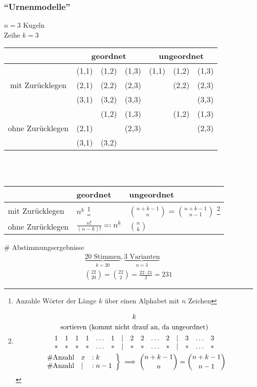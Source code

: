 \subsubsection{\enquote{Urnenmodelle}}
\begin{bsp*}
	$n=3$ Kugeln\\
	Zeihe $k=3$ \\
	\begin{tabular}{ c | c c c | c c c }
								&\multicolumn{3}{c|}{geordnet}	&\multicolumn{3}{c}{ungeordnet}		\\	\hline
		\multirow{3}{*}{mit Zurücklegen}	& (1,1)	& (1,2)	& (1,3)	& (1,1)	& (1,2)	& (1,3)		\\
								& (2,1)	& (2,2)	& (2,3)	&		& (2,2)	& (2,3)		\\
								& (3,1)	& (3,2)	& (3,3)	&		&		& (3,3)		\\	\hline
		\multirow{3}{*}{ohne Zurücklegen}	&		& (1,2)	& (1,3)	&		& (1,2)	& (1,3)		\\
								& (2,1)	&		& (2,3)	&		&		& (2,3)		\\
								& (3,1)	& (3,2)	&		&		&		&				
	\end{tabular}\\ \phantom{.} \\
	\begin{tabular}{ l | l | l }
						& geordnet															& ungeordnet							\\	\hline
		mit Zurücklegen		& $n^k$ \footnote{Anzahle Wörter der Länge $k$ über einen Alphabet mit $n$ Zeichen}	& $\binom{n+k-1}{n} = \binom{n+k-1}{n-1}$ \footnote{\begin{gather*}
		\underbrace{1 2 3 1 1 2 1 3 2 3 \dots 3 2}_k \\
		\text{sortieren (kommt nicht drauf an, da ungeordnet)}\\
		\begin{array}{ c c c c c c c c c c c c c c c }
			1	&1	&1	&1	&\dots	&1	&|	&2	&2	&\dots	&2	&|	&3	&\dots	&3	\\
			*	&*	&*	&*	&\dots	&*	&|	&*	&*	&\dots	&*	&|	&*	&\dots	&*	
		\end{array}\\
		\left.\begin{array}{ l l l }
			\# \text{Anzahl}	& x	&: k	\\
			\# \text{Anzahl}	& |	&: n-1
		\end{array} \right\} \implies \binom{n+k-1}{n} = \binom{n+k-1}{n-1}
		\end{gather*}}	\\	\hline
		ohne Zurücklegen	& $\frac{n!}{(n-k)!} \eqqcolon n^{\underline{k}}$								& $\binom{n}{k}$						
	\end{tabular}
\end{bsp*}
\begin{bsp*}{\# Abstimmungsergebnisse}
	\begin{gather*}
		\underbrace{20 \text{ Stimmen}}_{k=20}, \underbrace{3 \text{ Varianten}}_{n=3} \\
		\binom{22}{20} = \binom{22}{2} = \frac{22 \cdot 21}{2} = 231
	\end{gather*}
\end{bsp*}
